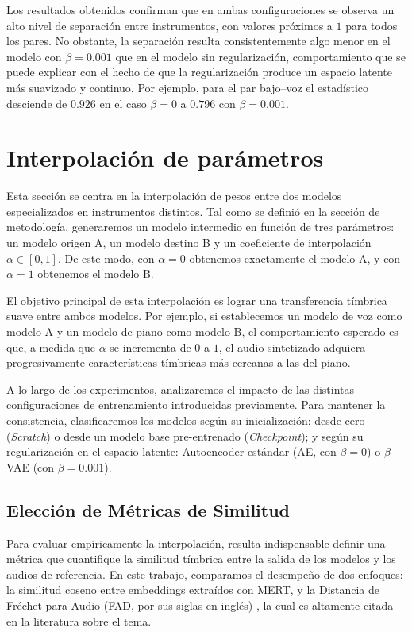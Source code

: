 \documentclass[12pt,a4paper,twoside]{tesis}
\begin{document}
Los resultados obtenidos confirman que en ambas configuraciones se observa un alto nivel de separación entre instrumentos, con valores próximos a $1$ para todos los pares. No obstante, la separación resulta consistentemente algo menor en el modelo con $\beta=0.001$ que en el modelo sin regularización, comportamiento que se puede explicar con el hecho de que la regularización produce un espacio latente más suavizado y continuo. Por ejemplo, para el par bajo--voz el estadístico desciende de $0.926$ en el caso $\beta=0$ a $0.796$ con $\beta=0.001$.

\newpage
\section{Interpolación de parámetros}

Esta sección se centra en la interpolación de pesos entre dos modelos especializados en instrumentos distintos. Tal como se definió en la sección de metodología, generaremos un modelo intermedio en función de tres parámetros: un modelo origen A, un modelo destino B y un coeficiente de interpolación $\alpha \in [0, 1]$. De este modo, con $\alpha=0$ obtenemos exactamente el modelo A, y con $\alpha=1$ obtenemos el modelo B. 

El objetivo principal de esta interpolación es lograr una transferencia tímbrica suave entre ambos modelos. Por ejemplo, si establecemos un modelo de voz como modelo A y un modelo de piano como modelo B, el comportamiento esperado es que, a medida que $\alpha$ se incrementa de $0$ a $1$, el audio sintetizado adquiera progresivamente características tímbricas más cercanas a las del piano.

A lo largo de los experimentos, analizaremos el impacto de las distintas configuraciones de entrenamiento introducidas previamente. Para mantener la consistencia, clasificaremos los modelos según su inicialización: desde cero (\textit{Scratch}) o desde un modelo base pre-entrenado (\textit{Checkpoint}); y según su regularización en el espacio latente: Autoencoder estándar (AE, con $\beta=0$) o $\beta$-VAE (con $\beta=0.001$).

\subsection{Elección de Métricas de Similitud}

Para evaluar empíricamente la interpolación, resulta indispensable definir una métrica que cuantifique la similitud tímbrica entre la salida de los modelos y los audios de referencia. En este trabajo, comparamos el desempeño de dos enfoques: la similitud coseno entre embeddings extraídos con MERT, y la Distancia de Fréchet para Audio (FAD, por sus siglas en inglés) \cite{gui2024adaptingfrechetaudiodistance}, la cual es altamente citada en la literatura sobre el tema.
\end{document}
